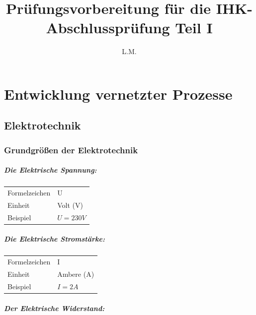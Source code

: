 \documentclass[a4paper, 12pt]{report}
\title{Prüfungsvorbereitung für die IHK-Abschlussprüfung Teil I}
\author{L.M.}
\begin{document}
\maketitle

\tableofcontents

\newpage
\chapter{Entwicklung vernetzter Prozesse}
\begin{multicols}{2}
\section{Elektrotechnik}
\subsection{Grundgrößen der Elektrotechnik}

\paragraph{Die Elektrische Spannung:}

\begin{center}
	\begin{tabular}{ ll }
		Formelzeichen & U            \\
		Einheit       & Volt (V)     \\
		Beispiel      & $U = 230V$ \\
	\end{tabular}
\end{center}

\paragraph{Die Elektrische Stromstärke:}

\begin{center}
	\begin{tabular}{ ll }
		Formelzeichen & I            \\
		Einheit       & Ambere (A)   \\
		Beispiel      & $I = 2A$    \\
	\end{tabular}
\end{center}

\paragraph{Der Elektrische Widerstand:}


\end{multicols}
\end{document}
